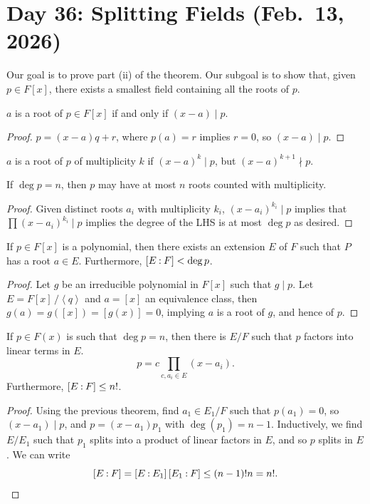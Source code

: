\section{Day 36: Splitting Fields (Feb.\ 13, 2026)}
Our goal is to prove part (ii) of the theorem. Our subgoal is to show that, given $p \in F[x]$, there exists a smallest field containing all the roots of $p$.
\begin{claim}
    $a$ is a root of $p \in F[x]$ if and only if $(x - a) \mid p$.
\end{claim}
\begin{proof}
    $p = (x - a) q + r$, where $p(a) = r$ implies $r = 0$, so $(x - a) \mid p$.
\end{proof}
\begin{definition}
    $a$ is a root of $p$ of multiplicity $k$ if $(x - a)^k \mid p$, but $(x - a)^{k+1} \nmid p$.
\end{definition}
\begin{proposition}
    If $\deg p = n$, then $p$ may have at most $n$ roots counted with multiplicity.
\end{proposition}
\begin{proof}
    Given distinct roots $a_i$ with multiplicity $k_i$, $(x - a_i)^{k_i} \mid p$ implies that $\prod (x - a_i)^{k_i} \mid p$ implies the degree of the LHS is at most $\deg p$ as desired.
\end{proof}
\begin{theorem}
    If $p \in F[x]$ is a polynomial, then there exists an extension $E$ of $F$ such that $P$ has a root $a \in E$. Furthermore, $\coor{E:F} < \deg p$.
\end{theorem}
\begin{proof}
    Let $g$ be an irreducible polynomial in $F[x]$ such that $g \mid p$. Let $E = F[x]\,/\!\left<q\right>$ and $a = [x]$ an equivalence class, then $g(a) = g([x]) = [g(x)] = 0$, implying $a$ is a root of $g$, and hence of $p$.
\end{proof}
\begin{corollary}
    If $p \in F(x)$ is such that $\deg p = n$, then there is $E/F$ such that $p$ factors into linear terms in $E$.
    \[ p = c \prod_{c, a_i \in E} (x - a_i). \]
    Furthermore, $\coor{E:F} \leq n!$.
\end{corollary}
\begin{proof}
    Using the previous theorem, find $a_1 \in E_1 / F$ such that $p(a_1) = 0$, so $(x - a_1) \mid p$, and $p = (x - a_1) p_1$ with $\deg(p_1) = n-1$. Inductively, we find $E/E_1$ such that $p_1$ splits into a product of linear factors in $E$, and so $p$ splits in $E$. We can write
    \[ \coor{E:F} = \coor{E:E_1} \coor{E_1:F} \leq (n-1)! n = n!. \qedhere \]
\end{proof}
